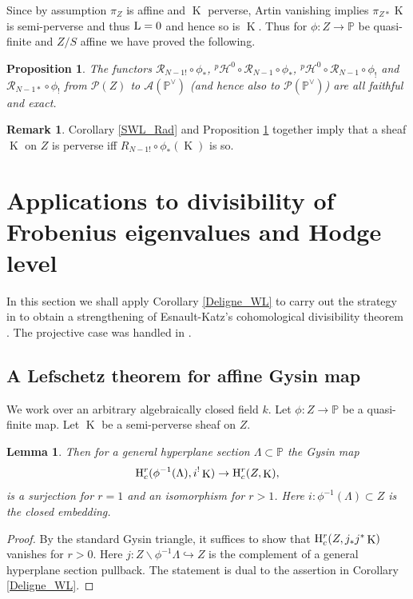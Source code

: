 \documentclass[12pt, reqno]{amsart}
\theoremstyle{plain}
\newtheorem{lem}[thm]{\bf Lemma}
\newtheorem{prop}[thm]{\bf Proposition}
\theoremstyle{definition}
\newtheorem{rem}[thm]{\bf Remark}
\theoremstyle{definition}
\newcommand{\bbP}{{\mathbb P}}
\newcommand{\cA}{{\mathcal A}}
\newcommand{\cP}{{\mathcal P}}
\newcommand{\cR}{{\mathcal R}}
\newcommand{\cpH}{{^p\mathcal{H}}}
\newcommand{\rH}{{\rm H}}
\DeclareMathOperator{\KK}{K}
\begin{document}
Since by assumption $\pi_Z$ is affine and $\KK$ perverse, Artin vanishing implies $\pi_{Z*}\KK$ is semi-perverse and thus $\textup{L}=0$ and hence so is $\KK$. Thus for $\phi \colon Z \to \bbP$ be quasi-finite and $Z/S$ affine we have proved the following.
\begin{prop}\label{SWL_converse}
    The functors $\cR_{N-1!}\circ \phi_*$, $\cpH^0 \circ \cR_{N-1} \circ \phi_*$, $\cpH^0 \circ \cR_{N-1} \circ \phi_!$ and $\cR_{N-1*} \circ \phi_!$ from $\cP(Z)$ to $\cA(\bbP^{\vee})$ (and hence also to $\cP(\bbP^{\vee})$) are all faithful and exact.   
\end{prop}

\begin{rem}\label{SWL_Converse_Rem}
 Corollary \ref{SWL_Rad} and Proposition \ref{SWL_converse} together imply that a sheaf $\KK$ on $Z$ is perverse iff $R_{N-1!}\circ \phi_*(\KK)$ is so.
\end{rem}






\section{Applications to divisibility of Frobenius eigenvalues and Hodge level}\label{Coho_Div}

In this section we shall apply Corollary \ref{Deligne_WL} to carry out the strategy in \cite{EW22} to obtain a strengthening of Esnault-Katz's cohomological divisibility theorem \cite[Theorem 2.3, (2)]{EK05}. The projective case was handled in \cite[Theorem 1.3]{EW22}. 

\subsection{A Lefschetz theorem for affine Gysin map}
We work over an arbitrary algebraically closed field $k$. Let $\phi \colon Z \to \bbP$ be a quasi-finite map.  Let $\KK$ be a semi-perverse sheaf on $Z$.

\begin{lem}\label{affine_Gysin}
    Then for a general hyperplane section $\Lambda \subset \bbP$ the Gysin map 
    \[
    \rH_c^{r}(\phi^{-1}(\Lambda),i^!\KK) \to \rH_c^{r}(Z,\KK),
    \]
    \noindent is a surjection for $r=1$ and an isomorphism for $r>1$. Here $i \colon \phi^{-1}(\Lambda) \subset  Z$ is the closed embedding.
\end{lem}

\begin{proof}
By the standard Gysin triangle, it suffices to show that $\rH_c^{r}(Z,j_*j^*\KK)$ vanishes for $r>0$. Here $j \colon Z\backslash \phi^{-1}\Lambda \hookrightarrow Z$ is the complement of a general hyperplane section pullback. The statement is dual to the assertion in Corollary \ref{Deligne_WL}.
\end{proof}
\end{document}
